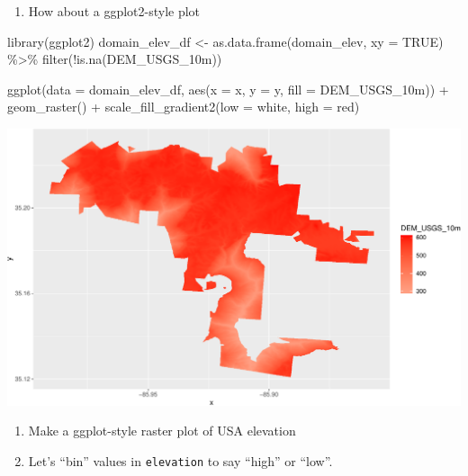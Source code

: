 \documentclass[
]{book}
\newenvironment{Shaded}{\begin{snugshade}}{\end{snugshade}}
\newcommand{\AttributeTok}[1]{\textcolor[rgb]{0.77,0.63,0.00}{#1}}
\newcommand{\ConstantTok}[1]{\textcolor[rgb]{0.00,0.00,0.00}{#1}}
\newcommand{\FunctionTok}[1]{\textcolor[rgb]{0.00,0.00,0.00}{#1}}
\newcommand{\NormalTok}[1]{#1}
\newcommand{\OtherTok}[1]{\textcolor[rgb]{0.56,0.35,0.01}{#1}}
\newcommand{\SpecialCharTok}[1]{\textcolor[rgb]{0.00,0.00,0.00}{#1}}
\newcommand{\StringTok}[1]{\textcolor[rgb]{0.31,0.60,0.02}{#1}}
\providecommand{\tightlist}{%
  \setlength{\itemsep}{0pt}\setlength{\parskip}{0pt}}
\begin{document}
\begin{enumerate}
\def\labelenumi{\arabic{enumi}.}
\setcounter{enumi}{30}
\tightlist
\item
  How about a ggplot2-style plot
\end{enumerate}

\begin{Shaded}
\begin{Highlighting}[]
\FunctionTok{library}\NormalTok{(ggplot2)}
\NormalTok{domain\_elev\_df }\OtherTok{\textless{}{-}} \FunctionTok{as.data.frame}\NormalTok{(domain\_elev, }\AttributeTok{xy =} \ConstantTok{TRUE}\NormalTok{) }\SpecialCharTok{\%\textgreater{}\%}
  \FunctionTok{filter}\NormalTok{(}\SpecialCharTok{!}\FunctionTok{is.na}\NormalTok{(DEM\_USGS\_10m))}


\FunctionTok{ggplot}\NormalTok{(}\AttributeTok{data =}\NormalTok{ domain\_elev\_df,}
       \FunctionTok{aes}\NormalTok{(}\AttributeTok{x =}\NormalTok{ x,}
                  \AttributeTok{y =}\NormalTok{ y,}
                  \AttributeTok{fill =}\NormalTok{ DEM\_USGS\_10m)) }\SpecialCharTok{+}
  \FunctionTok{geom\_raster}\NormalTok{() }\SpecialCharTok{+}
  \FunctionTok{scale\_fill\_gradient2}\NormalTok{(}\AttributeTok{low =} \StringTok{\textquotesingle{}white\textquotesingle{}}\NormalTok{, }\AttributeTok{high =} \StringTok{\textquotesingle{}red\textquotesingle{}}\NormalTok{)}
\end{Highlighting}
\end{Shaded}

\includegraphics{figures/unnamed-chunk-439-1.pdf}

\begin{enumerate}
\def\labelenumi{\arabic{enumi}.}
\setcounter{enumi}{31}
\item
  Make a ggplot-style raster plot of USA elevation
\item
  Let's ``bin'' values in \texttt{elevation} to say ``high'' or ``low''.
\end{enumerate}
\end{document}
